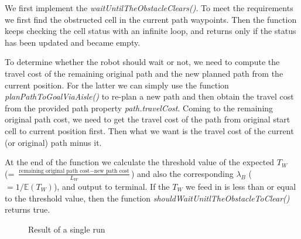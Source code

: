 \documentclass{article}
\begin{document}
We first implement the \textit{waitUntilTheObstacleClears()}. To meet the requirements we first find the obstructed cell in the current path waypoints. Then the function keeps checking the cell status with an infinite loop, and returns only if the status has been updated and became empty. 

To determine whether the robot should wait or not, we need to compute the travel cost of the remaining original path and the new planned path from the current position. For the latter we can simply use the function \textit{planPathToGoalViaAisle()} to re-plan a new path and then obtain the travel cost from the provided path property \textit{path.travelCost}. Coming to the remaining original path cost, we need to get the travel cost of the path from original start cell to current position first. Then what we want is the travel cost of the current (or original) path minus it. 

At the end of the function we calculate the threshold value of the expected $T_{W}$ (= $\frac{\text{remaining original path cost} - \text{new path cost}}{L_{W}}$) and also the corresponding $\lambda_{B}$ ($ = 1/ \mathbb{E}(T_{W})$), and output to terminal. If the $T_{W}$ we feed in is less than or equal to the threshold value, then the function \textit{shouldWaitUnitlTheObstacleToClear()} returns true.

\begin{figure}[H]
\centering  
{}
\caption{Result of a single run}
\label{result2.2}
\end{figure}
\end{document}
